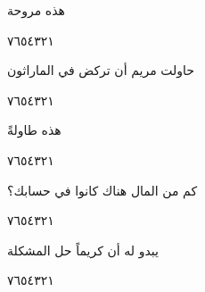 \documentclass[11pt, a4paper]{article}
\begin{document}
{\vspace{0.5\baselineskip}\begin{flushright}
\textarabic{هذه مروحة}
\end{flushright}

\begin{center}
        \hfill\textarabic{٧}\hfill\textarabic{٦}\hfill\textarabic{٥}\hfill\textarabic{٤}\hfill\textarabic{٣}\hfill\textarabic{٢}\hfill\textarabic{١}
        \end{center}


\vspace{0.5\baselineskip}\begin{flushright}
\textarabic{حاولت مريم أن تركض في الماراثون}
\end{flushright}

\begin{center}
        \hfill\textarabic{٧}\hfill\textarabic{٦}\hfill\textarabic{٥}\hfill\textarabic{٤}\hfill\textarabic{٣}\hfill\textarabic{٢}\hfill\textarabic{١}
        \end{center}

\vfill\clearpage

\vspace{0.5\baselineskip}\begin{flushright}
\textarabic{هذه طاولةً}
\end{flushright}

\begin{center}
        \hfill\textarabic{٧}\hfill\textarabic{٦}\hfill\textarabic{٥}\hfill\textarabic{٤}\hfill\textarabic{٣}\hfill\textarabic{٢}\hfill\textarabic{١}
        \end{center}


\vspace{0.5\baselineskip}\begin{flushright}
\textarabic{كم من المال هناك كانوا في حسابك؟}
\end{flushright}

\begin{center}
        \hfill\textarabic{٧}\hfill\textarabic{٦}\hfill\textarabic{٥}\hfill\textarabic{٤}\hfill\textarabic{٣}\hfill\textarabic{٢}\hfill\textarabic{١}
        \end{center}


\vspace{0.5\baselineskip}\begin{flushright}
\textarabic{يبدو له أن كريماً حل المشكلة}
\end{flushright}

\begin{center}
        \hfill\textarabic{٧}\hfill\textarabic{٦}\hfill\textarabic{٥}\hfill\textarabic{٤}\hfill\textarabic{٣}\hfill\textarabic{٢}\hfill\textarabic{١}
        \end{center}


}
\end{document}
